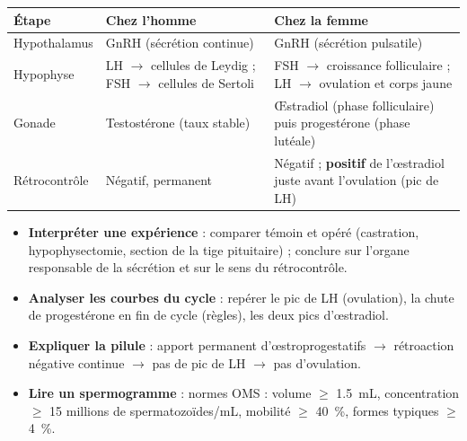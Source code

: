 \documentclass[11pt]{article}
\begin{document}
\begin{bilan}
\begin{center}
\begin{tabularx}{\linewidth}{|l|X|X|}
\hline
\rowcolor{popblueL} \textbf{Étape} & \textbf{Chez l'homme} & \textbf{Chez la femme} \\
\hline
Hypothalamus & GnRH (sécrétion continue) & GnRH (sécrétion pulsatile) \\
\hline
Hypophyse & LH $\to$ cellules de Leydig ; FSH $\to$ cellules de Sertoli & FSH $\to$ croissance folliculaire ; LH $\to$ ovulation et corps jaune \\
\hline
Gonade & Testostérone (taux stable) & \OE stradiol (phase folliculaire) puis progestérone (phase lutéale) \\
\hline
Rétrocontrôle & Négatif, permanent & Négatif ; \textbf{positif} de l'\oe stradiol juste avant l'ovulation (pic de LH) \\
\hline
\end{tabularx}
\end{center}
\end{bilan}

\begin{bilan}
\begin{itemize}
  \item \textbf{Interpréter une expérience} : comparer témoin et opéré (castration, hypophysectomie, section de la tige pituitaire) ; conclure sur l'organe responsable de la sécrétion et sur le sens du rétrocontrôle.
  \item \textbf{Analyser les courbes du cycle} : repérer le pic de LH (ovulation), la chute de progestérone en fin de cycle (règles), les deux pics d'\oe stradiol.
  \item \textbf{Expliquer la pilule} : apport permanent d'\oe stroprogestatifs $\to$ rétroaction négative continue $\to$ pas de pic de LH $\to$ pas d'ovulation.
  \item \textbf{Lire un spermogramme} : normes OMS : volume $\geq$ \SI{1,5}{mL}, concentration $\geq$ \num{15} millions de spermatozoïdes/mL, mobilité $\geq$ \SI{40}{\percent}, formes typiques $\geq$ \SI{4}{\percent}.
\end{itemize}
\end{bilan}
\end{document}
